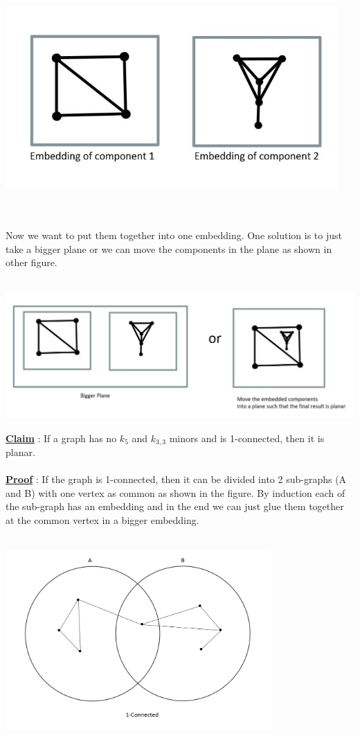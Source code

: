 \documentclass{article}
\begin{document}
    \\\\
    \centerline{\includegraphics[width=5in]{Images/component_embeddings.JPG}}
    \\\\
    Now we want to put them together into one embedding. One solution is to just take a bigger plane or we can move the components in the plane as shown in other figure.
    \\\\
    \centerline{\includegraphics[width=7in]{Images/0_connected_embedding.JPG}}
    \newpage
    \underline{\textbf{Claim}} : If a graph has no $k_{5}$ and $k_{3,3}$ minors and is 1-connected, then it is planar. 
    \\\\
    \underline{\textbf{Proof}} : If the graph is 1-connected, then it  can be divided into 2 sub-graphs (A and B) with one vertex as common as shown in the figure. By induction each of the sub-graph has an embedding and in the end we can just glue them together at the common vertex in a bigger embedding.  
    \\\\
    \centerline{\includegraphics[width=4in]{Images/1conngrapg.PNG}}
\end{document}
